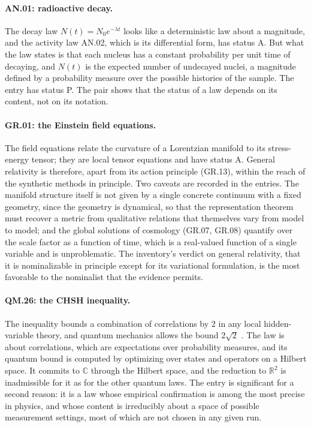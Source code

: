 \documentclass{situationist-preprint}
\begin{document}
\paragraph{AN.01: radioactive decay.} The decay law $N(t) = N_0e^{-\lambda t}$ looks like a deterministic law about a magnitude, and the activity law AN.02, which is its differential form, has status A. But what the law states is that each nucleus has a constant probability per unit time of decaying, and $N(t)$ is the expected number of undecayed nuclei, a magnitude defined by a probability measure over the possible histories of the sample. The entry has status P. The pair shows that the status of a law depends on its content, not on its notation.

\paragraph{GR.01: the Einstein field equations.} The field equations relate the curvature of a Lorentzian manifold to its stress-energy tensor; they are local tensor equations and have status A. General relativity is therefore, apart from its action principle (GR.13), within the reach of the synthetic methods in principle. Two caveats are recorded in the entries. The manifold structure itself is not given by a single concrete continuum with a fixed geometry, since the geometry is dynamical, so that the representation theorem must recover a metric from qualitative relations that themselves vary from model to model; and the global solutions of cosmology (GR.07, GR.08) quantify over the scale factor as a function of time, which is a real-valued function of a single variable and is unproblematic. The inventory's verdict on general relativity, that it is nominalizable in principle except for its variational formulation, is the most favorable to the nominalist that the evidence permits.

\paragraph{QM.26: the CHSH inequality.} The inequality bounds a combination of correlations by $2$ in any local hidden-variable theory, and quantum mechanics allows the bound $2\sqrt2$ \citep{CHSH1969,Cirelson1980}. The law is about correlations, which are expectations over probability measures, and its quantum bound is computed by optimizing over states and operators on a Hilbert space. It commits to $\mathbb C$ through the Hilbert space, and the reduction to $\mathbb R^2$ is inadmissible for it as for the other quantum laws. The entry is significant for a second reason: it is a law whose empirical confirmation is among the most precise in physics, and whose content is irreducibly about a space of possible measurement settings, most of which are not chosen in any given run.
\end{document}
